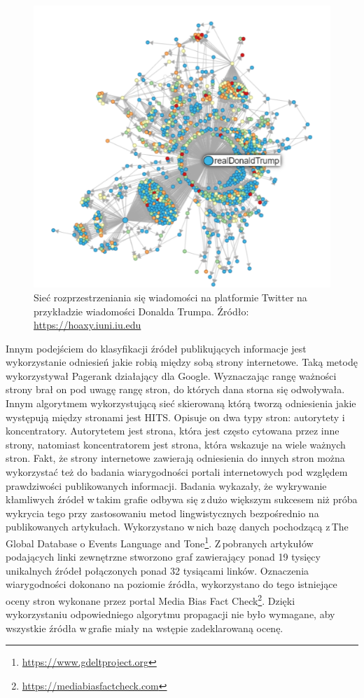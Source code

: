 \begin{figure}[!h]
	
	\centering \includegraphics[width=0.7\linewidth]{img/hoaxy.png}
	\caption{Sieć rozprzestrzeniania się wiadomości na platformie Twitter na przykładzie wiadomości Donalda Trumpa. Źródło: \url{https://hoaxy.iuni.iu.edu}}
	\label{fig:hoaxyTrump}
\end{figure}
\par
Innym podejściem do klasyfikacji źródeł publikujących informacje jest wykorzystanie odniesień jakie robią między sobą strony internetowe. Taką metodę wykorzystywał Pagerank działający dla Google. Wyznaczając rangę ważności strony brał on pod uwagę rangę stron, do których dana storna się odwoływała. Innym algorytmem wykorzystującą sieć skierowaną którą tworzą odniesienia jakie występują między stronami jest HITS. Opisuje on dwa typy stron: autorytety i\,koncentratory. Autorytetem jest strona, która jest często cytowana przez inne strony, natomiast koncentratorem jest strona, która wskazuje na wiele ważnych stron. Fakt, że strony internetowe zawierają odniesienia do innych stron można wykorzystać też do badania wiarygodności portali internetowych pod względem prawdziwości publikowanych informacji. Badania wykazały, że wykrywanie kłamliwych źródeł w\,takim grafie odbywa się z\,dużo większym sukcesem niż próba wykrycia tego przy zastosowaniu metod lingwistycznych bezpośrednio na publikowanych artykułach\cite{fairbanks2018credibility}. Wykorzystano w\,nich bazę danych pochodzącą z\,The Global Database o Events Language and Tone\footnote{\url{https://www.gdeltproject.org}}. Z\,pobranych artykułów podających linki zewnętrzne stworzono graf zawierający ponad 19 tysięcy unikalnych źródeł połączonych ponad 32 tysiącami linków. Oznaczenia wiarygodności dokonano na poziomie źródła, wykorzystano do tego istniejące oceny stron wykonane przez portal Media Bias Fact Check\footnote{\url{https://mediabiasfactcheck.com}}. Dzięki wykorzystaniu odpowiedniego algorytmu propagacji nie było wymagane, aby wszystkie źródła w\,grafie miały na wstępie zadeklarowaną ocenę. 